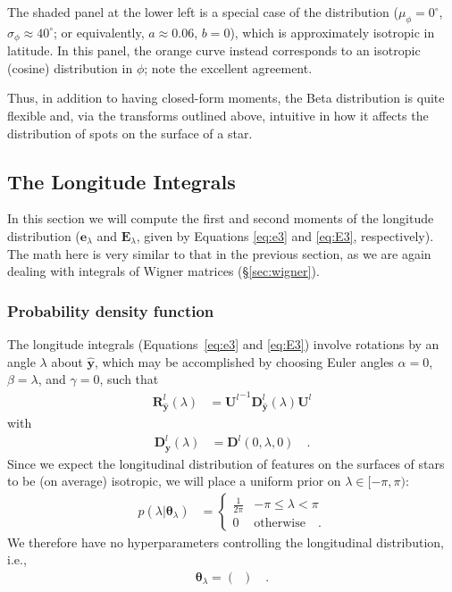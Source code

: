 \documentclass[modern]{aastex62}
\begin{document}
The shaded panel at the lower left is a special case of the distribution
($\mu_\phi = 0^\circ$, $\sigma_\phi \approx 40^\circ$; or equivalently,
$a \approx 0.06$, $b = 0$), which is approximately isotropic in latitude. In
this panel, the orange curve instead corresponds to an isotropic (cosine)
distribution in $\phi$; note the excellent agreement.

Thus, in addition to having closed-form moments, the Beta distribution is
quite flexible and, via the transforms outlined above, intuitive in how
it affects the distribution of spots on the surface of a star.

\subsection{The Longitude Integrals}
\label{sec:lon}

In this section we will compute the first and second moments
of the longitude distribution
($\mathbf{e}_\lambda$ and $\mathbf{E}_\lambda$, given by Equations
\ref{eq:e3} and \ref{eq:E3}, respectively). The math here is
very similar to that in the previous section, as we are again
dealing with integrals of Wigner matrices (\S\ref{sec:wigner}).

\subsubsection{Probability density function}
%
The longitude integrals (Equations~\ref{eq:e3} and \ref{eq:E3}) involve
rotations by an angle $\lambda$ about $\hat{\mathbf{y}}$, which
may be accomplished by choosing
Euler angles $\alpha = 0$, $\beta = \lambda$, and
$\gamma = 0$, such that
%
\begin{align}
    \mathbf{R}^l_{\hat{\mathbf{y}}}(\lambda)
     & =
    {\mathbf{U}^l}^{-1} \mathbf{D}^l_{\hat{\mathbf{y}}}(\lambda) \mathbf{U}^l
\end{align}
%
with
\begin{align}
    \mathbf{D}^l_{\hat{\mathbf{y}}}(\lambda)
     & =
    \mathbf{D}^l\left(0, \lambda, 0\right)
    \quad.
\end{align}
%
Since we expect the longitudinal distribution of features on the surfaces
of stars to be (on average) isotropic, we will place a uniform prior on
$\lambda \in [-\pi, \pi)$:
%
\begin{align}
    p(\lambda \big| \pmb{\theta}_\lambda)
     & =
    \begin{cases}
        \frac{1}{2\pi} & -\pi \leq \lambda < \pi
        \\
        0              & \mathrm{otherwise} \quad.
    \end{cases}
\end{align}
%
We therefore have no hyperparameters
controlling the longitudinal distribution, i.e.,
%
\begin{align}
    \pmb{\theta}_\lambda = \left( \,\,\, \right)
    \quad.
\end{align}
%
\end{document}
